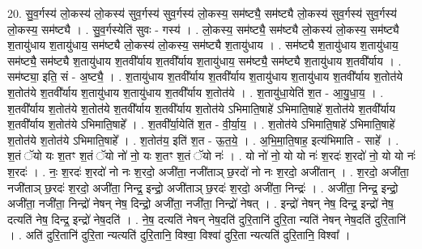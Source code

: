 \documentclass[17pt]{extarticle}
\begin{document}
20. सु॒व॒र्गस्य॑ लो॒कस्य॑ लो॒कस्य॑ सुव॒र्गस्य॑ सुव॒र्गस्य॑ लो॒कस्य॒ सम॑ष्ट्यै॒ सम॑ष्ट्यै लो॒कस्य॑ सुव॒र्गस्य॑ सुव॒र्गस्य॑ लो॒कस्य॒ सम॑ष्ट्यै । . सु॒व॒र्गस्येति॑ सुवः - गस्य॑ । . लो॒कस्य॒ सम॑ष्ट्यै॒ सम॑ष्ट्यै लो॒कस्य॑ लो॒कस्य॒ सम॑ष्ट्यै श॒तायु॑धाय श॒तायु॑धाय॒ सम॑ष्ट्यै लो॒कस्य॑ लो॒कस्य॒ सम॑ष्ट्यै श॒तायु॑धाय । . सम॑ष्ट्यै श॒तायु॑धाय श॒तायु॑धाय॒ सम॑ष्ट्यै॒ सम॑ष्ट्यै श॒तायु॑धाय श॒तवी᳚र्याय श॒तवी᳚र्याय श॒तायु॑धाय॒ सम॑ष्ट्यै॒ सम॑ष्ट्यै श॒तायु॑धाय श॒तवी᳚र्याय । . सम॑ष्ट्या॒ इति॒ सं - अ॒ष्ट्यै॒ । . श॒तायु॑धाय श॒तवी᳚र्याय श॒तवी᳚र्याय श॒तायु॑धाय श॒तायु॑धाय श॒तवी᳚र्याय श॒तोत॑ये श॒तोत॑ये श॒तवी᳚र्याय श॒तायु॑धाय श॒तायु॑धाय श॒तवी᳚र्याय श॒तोत॑ये । . श॒तायु॑धा॒येति॑ श॒त - आ॒यु॒धा॒य॒ । . श॒तवी᳚र्याय श॒तोत॑ये श॒तोत॑ये श॒तवी᳚र्याय श॒तवी᳚र्याय श॒तोत॑ये ऽभिमाति॒षाहे॑ ऽभिमाति॒षाहे॑ श॒तोत॑ये श॒तवी᳚र्याय श॒तवी᳚र्याय श॒तोत॑ये ऽभिमाति॒षाहे᳚ । . श॒तवी᳚र्या॒येति॑ श॒त - वी॒र्या॒य॒ । . श॒तोत॑ये ऽभिमाति॒षाहे॑ ऽभिमाति॒षाहे॑ श॒तोत॑ये श॒तोत॑ये ऽभिमाति॒षाहे᳚ । . श॒तोत॑य॒ इति॑ श॒त - ऊ॒त॒ये॒ । . अ॒भि॒मा॒ति॒षाह॒ इत्य॑भिमाति - साहे᳚ । . श॒तं ॅयो यः श॒तꣳ श॒तं ॅयो नो॑ नो॒ यः श॒तꣳ श॒तं ॅयो नः॑ । . यो नो॑ नो॒ यो यो नः॑ श॒रदः॑ श॒रदो॑ नो॒ यो यो नः॑ श॒रदः॑ । . नः॒ श॒रदः॑ श॒रदो॑ नो नः श॒रदो॒ अजी॑ता॒ नजी॑ताञ् छ॒रदो॑ नो नः श॒रदो॒ अजी॑तान् । . श॒रदो॒ अजी॑ता॒ नजी॑ताञ् छ॒रदः॑ श॒रदो॒ अजी॑ता॒ निन्द्र॒ इन्द्रो॒ अजी॑ताञ् छ॒रदः॑ श॒रदो॒ अजी॑ता॒ निन्द्रः॑ । . अजी॑ता॒ निन्द्र॒ इन्द्रो॒ अजी॑ता॒ नजी॑ता॒ निन्द्रो॑ नेषन् नेष॒ दिन्द्रो॒ अजी॑ता॒ नजी॑ता॒ निन्द्रो॑ नेषत् । . इन्द्रो॑ नेषन् नेष॒ दिन्द्र॒ इन्द्रो॑ नेष॒ दत्यति॑ नेष॒ दिन्द्र॒ इन्द्रो॑ नेष॒दति॑ । . ने॒ष॒ दत्यति॑ नेषन् नेष॒दति॑ दुरि॒तानि॑ दुरि॒ता न्यति॑ नेषन् नेष॒दति॑ दुरि॒तानि॑ । . अति॑ दुरि॒तानि॑ दुरि॒ता न्यत्यति॑ दुरि॒तानि॒ विश्वा॒ विश्वा॑ दुरि॒ता न्यत्यति॑ दुरि॒तानि॒ विश्वा᳚ । \newline
\end{document}
